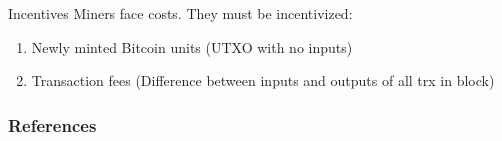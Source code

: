 \documentclass[]{beamer}
\begin{document}
\begin{frame}{Incentives}
Miners face costs. They must be incentivized:

\begin{enumerate}
	\item Newly minted Bitcoin units (UTXO with no inputs)
	\item Transaction fees (Difference between inputs and outputs of all trx in block)
\end{enumerate} \vspace{1em}

\end{frame}

\begin{frame}%
	\frametitle{References}
	
	
\end{frame}
\end{document}
